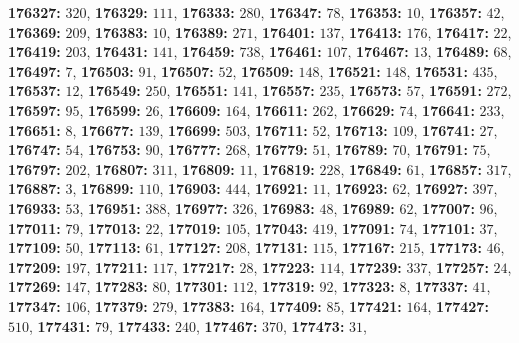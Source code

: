 \textsf{\bfseries 176327:} $320$, \textsf{\bfseries 176329:} $111$, \textsf{\bfseries 176333:} $280$, \textsf{\bfseries 176347:} $78$, \textsf{\bfseries 176353:} $10$, \textsf{\bfseries 176357:} $42$, \textsf{\bfseries 176369:} $209$, \textsf{\bfseries 176383:} $10$, \textsf{\bfseries 176389:} $271$, \textsf{\bfseries 176401:} $137$, \textsf{\bfseries 176413:} $176$, \textsf{\bfseries 176417:} $22$, \textsf{\bfseries 176419:} $203$, \textsf{\bfseries 176431:} $141$, \textsf{\bfseries 176459:} $738$, \textsf{\bfseries 176461:} $107$, \textsf{\bfseries 176467:} $13$, \textsf{\bfseries 176489:} $68$, \textsf{\bfseries 176497:} $7$, \textsf{\bfseries 176503:} $91$, \textsf{\bfseries 176507:} $52$, \textsf{\bfseries 176509:} $148$, \textsf{\bfseries 176521:} $148$, \textsf{\bfseries 176531:} $435$, \textsf{\bfseries 176537:} $12$, \textsf{\bfseries 176549:} $250$, \textsf{\bfseries 176551:} $141$, \textsf{\bfseries 176557:} $235$, \textsf{\bfseries 176573:} $57$, \textsf{\bfseries 176591:} $272$, \textsf{\bfseries 176597:} $95$, \textsf{\bfseries 176599:} $26$, \textsf{\bfseries 176609:} $164$, \textsf{\bfseries 176611:} $262$, \textsf{\bfseries 176629:} $74$, \textsf{\bfseries 176641:} $233$, \textsf{\bfseries 176651:} $8$, \textsf{\bfseries 176677:} $139$, \textsf{\bfseries 176699:} $503$, \textsf{\bfseries 176711:} $52$, \textsf{\bfseries 176713:} $109$, \textsf{\bfseries 176741:} $27$, \textsf{\bfseries 176747:} $54$, \textsf{\bfseries 176753:} $90$, \textsf{\bfseries 176777:} $268$, \textsf{\bfseries 176779:} $51$, \textsf{\bfseries 176789:} $70$, \textsf{\bfseries 176791:} $75$, \textsf{\bfseries 176797:} $202$, \textsf{\bfseries 176807:} $311$, \textsf{\bfseries 176809:} $11$, \textsf{\bfseries 176819:} $228$, \textsf{\bfseries 176849:} $61$, \textsf{\bfseries 176857:} $317$, \textsf{\bfseries 176887:} $3$, \textsf{\bfseries 176899:} $110$, \textsf{\bfseries 176903:} $444$, \textsf{\bfseries 176921:} $11$, \textsf{\bfseries 176923:} $62$, \textsf{\bfseries 176927:} $397$, \textsf{\bfseries 176933:} $53$, \textsf{\bfseries 176951:} $388$, \textsf{\bfseries 176977:} $326$, \textsf{\bfseries 176983:} $48$, \textsf{\bfseries 176989:} $62$, \textsf{\bfseries 177007:} $96$, \textsf{\bfseries 177011:} $79$, \textsf{\bfseries 177013:} $22$, \textsf{\bfseries 177019:} $105$, \textsf{\bfseries 177043:} $419$, \textsf{\bfseries 177091:} $74$, \textsf{\bfseries 177101:} $37$, \textsf{\bfseries 177109:} $50$, \textsf{\bfseries 177113:} $61$, \textsf{\bfseries 177127:} $208$, \textsf{\bfseries 177131:} $115$, \textsf{\bfseries 177167:} $215$, \textsf{\bfseries 177173:} $46$, \textsf{\bfseries 177209:} $197$, \textsf{\bfseries 177211:} $117$, \textsf{\bfseries 177217:} $28$, \textsf{\bfseries 177223:} $114$, \textsf{\bfseries 177239:} $337$, \textsf{\bfseries 177257:} $24$, \textsf{\bfseries 177269:} $147$, \textsf{\bfseries 177283:} $80$, \textsf{\bfseries 177301:} $112$, \textsf{\bfseries 177319:} $92$, \textsf{\bfseries 177323:} $8$, \textsf{\bfseries 177337:} $41$, \textsf{\bfseries 177347:} $106$, \textsf{\bfseries 177379:} $279$, \textsf{\bfseries 177383:} $164$, \textsf{\bfseries 177409:} $85$, \textsf{\bfseries 177421:} $164$, \textsf{\bfseries 177427:} $510$, \textsf{\bfseries 177431:} $79$, \textsf{\bfseries 177433:} $240$, \textsf{\bfseries 177467:} $370$, \textsf{\bfseries 177473:} $31$, 
